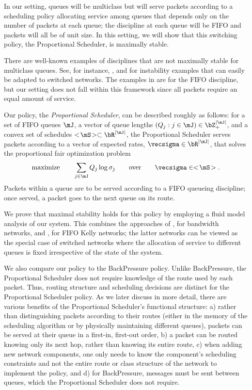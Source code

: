 \documentclass{amsart}
\begin{document}
In our setting, queues will be multiclass but will serve packets according to a scheduling policy allocating service among queues that depends only on the number of packets at each queue; 
the discipline at each queue will be FIFO and packets will all be of unit size. 
In this setting, we will show that this switching policy, the Proportional Scheduler, is maximally stable.

There are well-known examples of disciplines that are not maximally stable 
for multiclass queues. See, for instance, \cite{LuKu91}, \cite{RySt92} and \cite{Br94} for instability examples that can easily be adapted to switched networks.  The examples in \cite{Br94} are for the FIFO discipline, but our setting does not fall within this framework since all packets require an equal amount of service.

Our policy, the \emph{Proportional Scheduler}, can be described roughly as follows: for a set of FIFO queues $\mJ$, a vector of queue lengths $(Q_j: j\in\mJ)\in \bZ_+^{|\mJ|}$, and a convex set of schedules $ <\!\mS \!> \subset \bR^{|\mJ|}$, the Proportional Scheduler serves packets according to a vector of expected rates,  $\vecsigma \in \bR^{|\mJ|}$, that solves the proportional fair optimization problem
\begin{align}\label{IntroPF}
\text{maximize}\qquad \sum_{j\in\mJ} Q_j \log \sigma_j \qquad
\text{over}\qquad  \vecsigma \in <\! \mS \! >.
\end{align}
Packets within a queue are to be served according to a FIFO queueing discipline; once served, a packet goes to the next queue on its route.

We  prove that maximal stability holds for this policy by employing a fluid model analysis of our system. This combines the approaches of \cite{Ma07}, for bandwidth networks, and \cite{Br96a}, for FIFO Kelly networks; the latter networks can be viewed as the special case of switched networks where the allocation of
service to different queues is fixed irrespective of the state of the system.

We also compare our policy to the BackPressure policy. Unlike BackPressure, the Proportional Scheduler does not require knowledge of the route used by each packet. Thus, routing structure and scheduling decisions are distinct
for the Proportional Scheduler policy. 
As we later discuss in more detail, there are various benefits of the Proportional Scheduler's functional structure: 
a) rather than distinguishing packets according to their routes (either in the memory of the scheduling algorithm or by physically maintaining different queues), packets can be served at their queue in a first-in, first-out order, 
b) a packet can be routed knowing only its next hop, rather than knowing its entire route,
c) when adding new network components, one only needs to know the component's scheduling constraints and not the entire route or class structure of the network to implement the policy, and
d) for BackPressure, messages must be sent between queues, which the Proportional Scheduler does not require. 
\end{document}
